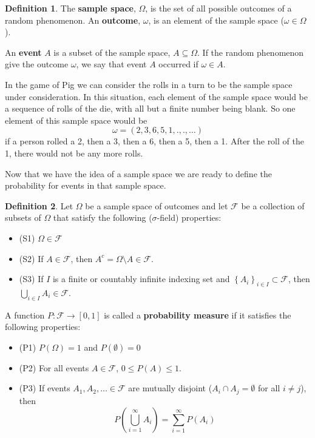 \documentclass[
]{book}
\providecommand{\tightlist}{%
  \setlength{\itemsep}{0pt}\setlength{\parskip}{0pt}}
\theoremstyle{definition}
\newtheorem{definition}{Definition}[chapter]
\theoremstyle{definition}
\theoremstyle{definition}
\theoremstyle{definition}
\theoremstyle{remark}
\begin{document}
\begin{definition}
The \textbf{sample space}, \(\Omega\), is the set of all possible outcomes of a random phenomenon. An \textbf{outcome}, \(\omega\), is an element of the sample space (\(\omega \in \Omega\)).

An \textbf{event} \(A\) is a subset of the sample space, \(A \subseteq \Omega\). If the random phenomenon give the outcome \(\omega\), we say that event \(A\) occurred if \(\omega \in A\).
\end{definition}

In the game of Pig we can consider the rolls in a turn to be the sample space under consideration. In this situation, each element of the sample space would be a sequence of rolls of the die, with all but a finite number being blank. So one element of this sample space would be
\[\omega = (2,3,6,5,1,.,.,\ldots)\] if a person rolled a 2, then a 3, then a 6, then a 5, then a 1. After the roll of the 1, there would not be any more rolls.

Now that we have the idea of a sample space we are ready to define the probability for events in that sample space.

\begin{definition}

Let \(\Omega\) be a sample space of outcomes and let \(\mathcal{F}\) be a collection of subsets of \(\Omega\) that satisfy the following (\(\sigma\)-field) properties:

\begin{itemize}
\tightlist
\item
  (S1) \(\Omega \in \mathcal{F}\)
\item
  (S2) If \(A\in \mathcal{F}\), then \(A^c = \Omega\setminus A \in \mathcal{F}\).
\item
  (S3) If \(I\) is a finite or countably infinite indexing set and \(\left\{A_i \right\}_{i\in I} \subset \mathcal{F}\), then \(\bigcup_{i\in I} A_i \in \mathcal{F}\).
\end{itemize}

A function \(P:\mathcal{F} \rightarrow [0,1]\) is called a \textbf{probability measure} if it satisfies the following properties:

\begin{itemize}
\tightlist
\item
  (P1) \(P(\Omega) = 1\) and \(P(\emptyset)=0\)
\item
  (P2) For all events \(A \in \mathcal{F}\), \(0\leq P(A) \leq 1\).
\item
  (P3) If events \(A_1, A_2, \ldots \in \mathcal{F}\) are mutually disjoint (\(A_i \cap A_j = \emptyset\) for all \(i\neq j\)), then
  \[P\left(\bigcup_{i=1}^\infty A_i \right) = \sum_{i=1}^\infty P(A_i)\]
\end{itemize}

\end{definition}
\end{document}

